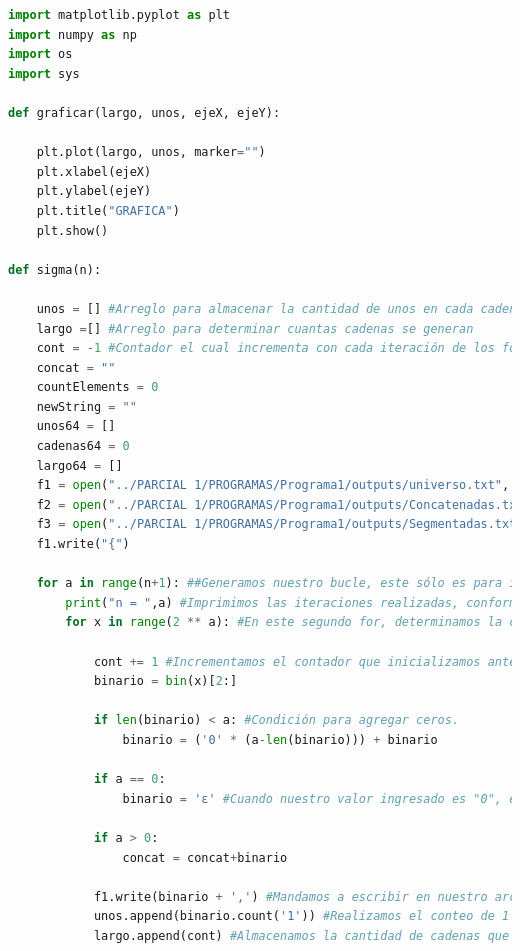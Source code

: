 \documentclass{article}
\begin{document}
\begin{lstlisting}[language=Python, caption=Implementación del Universo]
import matplotlib.pyplot as plt
import numpy as np
import os
import sys

def graficar(largo, unos, ejeX, ejeY):
    
    plt.plot(largo, unos, marker="")
    plt.xlabel(ejeX)
    plt.ylabel(ejeY)
    plt.title("GRAFICA")
    plt.show()

def sigma(n):

    unos = [] #Arreglo para almacenar la cantidad de unos en cada cadena binaria.
    largo =[] #Arreglo para determinar cuantas cadenas se generan
    cont = -1 #Contador el cual incrementa con cada iteración de los fors.
    concat = ""
    countElements = 0
    newString = ""
    unos64 = []
    cadenas64 = 0
    largo64 = []
    f1 = open("../PARCIAL 1/PROGRAMAS/Programa1/outputs/universo.txt", "w", encoding="utf-8") 
    f2 = open("../PARCIAL 1/PROGRAMAS/Programa1/outputs/Concatenadas.txt", "w", encoding="utf-8")
    f3 = open("../PARCIAL 1/PROGRAMAS/Programa1/outputs/Segmentadas.txt", "w", encoding="utf-8")
    f1.write("{") 

    for a in range(n+1): ##Generamos nuestro bucle, este sólo es para imprimir la cantidad de iteraciones que se llevan a cabo. Ponemos n+1, ya que 
        print("n = ",a) #Imprimimos las iteraciones realizadas, conforme se va realizando cada una de ellas.
        for x in range(2 ** a): #En este segundo for, determinamos la cantidad de cadenas que habrá según el valor de a, es decir, según el número de iteración. Esto se determina con 2^a.
            
            cont += 1 #Incrementamos el contador que inicializamos anteriormente, esto para llevar el conteo de cadenas.
            binario = bin(x)[2:] 
            
            if len(binario) < a: #Condición para agregar ceros.
                binario = ('0' * (a-len(binario))) + binario 
            
            if a == 0: 
                binario = 'ε' #Cuando nuestro valor ingresado es "0", el universo se determina con su respectivo símbolo.

            if a > 0:
                concat = concat+binario

            f1.write(binario + ',') #Mandamos a escribir en nuestro archivo cada una de las cadenas generadas.
            unos.append(binario.count('1')) #Realizamos el conteo de 1's en cada cadena y lo guardamos en el arreglo de unos.
            largo.append(cont) #Almacenamos la cantidad de cadenas que van en cada iteración


\end{lstlisting}
\end{document}
